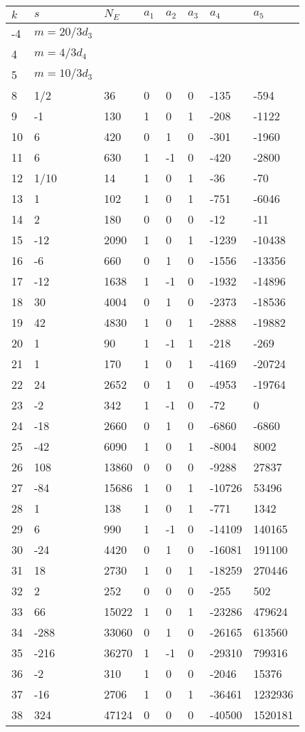 \documentclass{amsart}
\begin{document}
\begin{longtable}{|l|l|l|lllll|}
\hline
$k$ & $s$ & $N_E$ & $a_1$ & $a_2$ & $a_3$ & $a_4$ & $a_5$\\
\hline
-4&$m=20/3d_{3}$&&\multicolumn{5}{c|}{}\\
4&$m=4/3d_{4}$&&\multicolumn{5}{c|}{}\\
5&$m=10/3d_{3}$&&\multicolumn{5}{c|}{}\\
8&1/2&36&0&0&0&-135&-594\\
9&-1&130&1&0&1&-208&-1122\\
10&6&420&0&1&0&-301&-1960\\
11&6&630&1&-1&0&-420&-2800\\
12&1/10&14&1&0&1&-36&-70\\
13&1&102&1&0&1&-751&-6046\\
14&2&180&0&0&0&-12&-11\\
15&-12&2090&1&0&1&-1239&-10438\\
16&-6&660&0&1&0&-1556&-13356\\
17&-12&1638&1&-1&0&-1932&-14896\\
18&30&4004&0&1&0&-2373&-18536\\
19&42&4830&1&0&1&-2888&-19882\\
20&1&90&1&-1&1&-218&-269\\
21&1&170&1&0&1&-4169&-20724\\
22&24&2652&0&1&0&-4953&-19764\\
23&-2&342&1&-1&0&-72&0\\
24&-18&2660&0&1&0&-6860&-6860\\
25&-42&6090&1&0&1&-8004&8002\\
26&108&13860&0&0&0&-9288&27837\\
27&-84&15686&1&0&1&-10726&53496\\
28&1&138&1&0&1&-771&1342\\
29&6&990&1&-1&0&-14109&140165\\
30&-24&4420&0&1&0&-16081&191100\\
31&18&2730&1&0&1&-18259&270446\\
32&2&252&0&0&0&-255&502\\
33&66&15022&1&0&1&-23286&479624\\
34&-288&33060&0&1&0&-26165&613560\\
35&-216&36270&1&-1&0&-29310&799316\\
36&-2&310&1&0&0&-2046&15376\\
37&-16&2706&1&0&1&-36461&1232936\\
38&324&47124&0&0&0&-40500&1520181\\

\end{longtable}
\end{document}
